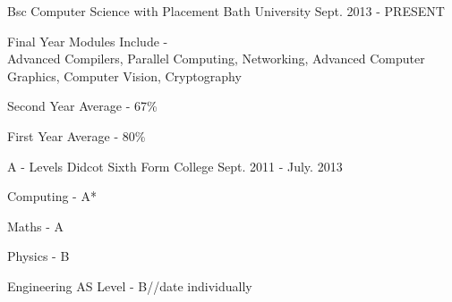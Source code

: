 


\begin{cventries}


\cventry
{Bsc Computer Science with Placement} %
{Bath University} %
{} %
{Sept. 2013 - PRESENT} %
{ %
\begin{cvitems}
\item {Final Year Modules Include -\\ \blank{0.5cm} Advanced Compilers, Parallel Computing, Networking, Advanced Computer Graphics, Computer Vision, Cryptography}
\item {Second Year Average - 67\%}
\item {First Year Average - 80\%}
\end{cvitems}
}
\cventry
{A - Levels} %
{Didcot Sixth Form College} %
{} %
{Sept. 2011 - July. 2013} %
{ %
\begin{cvitems}
\item {Computing - A*}
\item {Maths - A}
\item {Physics - B}
\item {Engineering AS Level - B}//date individually
\end{cvitems}
}


\end{cventries}